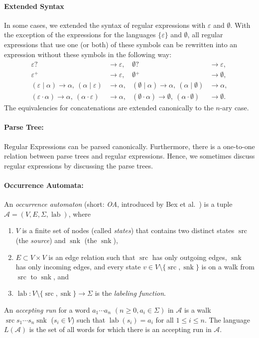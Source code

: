\documentclass[a4paper,11pt, svgnames,titlepage]{article}
\newcommand{\rxp}{{^\mathtt{+}}}
\newcommand{\rxo}{\mathtt{?}}
\newcommand{\rxc}{\cdot}
\DeclareMathOperator{\ror}{\mathtt{|}}
\newcommand{\emptyword}{\varepsilon}
\DeclareMathOperator{\lab}{lab}
\DeclareMathOperator{\src}{src}
\DeclareMathOperator{\snk}{snk}
\begin{document}
\paragraph{Extended Syntax} In some cases, we extended the syntax of regular expressions with $\emptyword$ and $\emptyset$. With the exception of the expressions for the languages $\{\emptyword\}$ and $\emptyset$, all regular expressions that use one (or both) of these symbols can be rewritten into an expression without these symbols in the following way:
\begin{align*}
	\emptyword \rxo &\to \emptyword, & \emptyset \rxo &\to \emptyword,\\
	\emptyword \rxp &\to \emptyword, & \emptyset \rxp &\to \emptyset,\\
	(\emptyword \ror \alpha)\to\alpha,\ (\alpha \ror \emptyword)&\to \alpha, & (\emptyset \ror \alpha)\to\alpha,\ (\alpha \ror \emptyset) &\to \alpha,\\
	(\emptyword \rxc \alpha)\to\alpha,\ (\alpha \rxc \emptyword)&\to \alpha, & (\emptyset \rxc \alpha)\to\emptyset,\ (\alpha \rxc \emptyset) &\to \emptyset.
\end{align*}
The equivalencies for concatenations are extended canonically to the $n$-ary case.

\paragraph{Parse Tree:} Regular Expressions can be parsed canonically. Furthermore, there is a one-to-one relation between parse trees and regular expressions. Hence, we sometimes discuss regular expressions by discussing the parse trees.

\paragraph{Occurrence Automata:} An \emph{occurrence automaton} (short: \emph{OA}, introduced by Bex et al.~\cite{bex:kore}) is a tuple $\mathcal{A}=(V,E,\Sigma,\lab)$, where 
\begin{enumerate}
	\item $V$ is a finite set of nodes (called \emph{states}) that contains two distinct states $\src$ (the \emph{source}) and $\snk$ (the $\snk$),
	\item $E\subset V\times V$ is an edge relation such that $\src$ has only outgoing edges, $\snk$ has only incoming edges, and every state $v\in V\setminus\{\src,\snk\}$ is on a walk from $\src$ to $\snk$, and
	\item $\lab: V\setminus\{\src,\snk\} \to \Sigma $ is the \emph{labeling function}. 
\end{enumerate}
An \emph{accepting run} for a word $a_1 \cdots a_n$ $(n\geq 0, a_i\in\Sigma)$ in $\mathcal{A}$ is a walk $\src s_1 \cdots s_n \snk$ ($s_i\in V$) such that $\lab(s_i)=a_i$ for all $1\leq i \leq n$. The language $L(\mathcal{A})$ is the set of all words for which there is an accepting run in $\mathcal{A}$.
\end{document}
